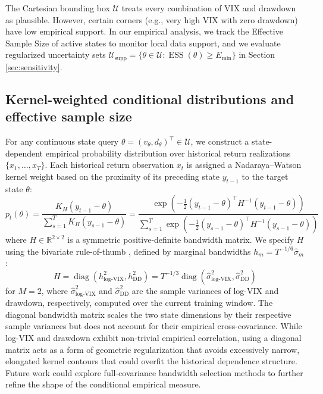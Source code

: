 \documentclass[smallextended]{svjour3}
\begin{document}
\begin{remark}
The Cartesian bounding box $\mathcal{U}$ treats every combination of VIX and drawdown as plausible. However, certain corners (e.g., very high VIX with zero drawdown) have low empirical support. In our empirical analysis, we track the Effective Sample Size of active states to monitor local data support, and we evaluate regularized uncertainty sets $\mathcal{U}_{\text{supp}} = \{\theta \in \mathcal{U} : \operatorname{ESS}(\theta) \ge E_{\min}\}$ in Section \ref{sec:sensitivity}.
\end{remark}






\subsection{Kernel-weighted conditional distributions and effective sample size}
For any continuous state query $\theta = (v_\theta, d_\theta)^\top \in \mathcal{U}$, we construct a state-dependent empirical probability distribution over historical return realizations $\{x_1, \dots, x_T\}$. Each historical return observation $x_t$ is assigned a Nadaraya--Watson kernel weight \cite{nadaraya1964estimating, watson1964smooth} based on the proximity of its preceding state $y_{t-1}$ to the target state $\theta$:
\begin{equation}
    p_t(\theta) = \frac{K_H(y_{t-1} - \theta)}{\sum_{s=1}^{T} K_H(y_{s-1} - \theta)} = \frac{\exp\left(-\frac{1}{2}(y_{t-1} - \theta)^\top H^{-1} (y_{t-1} - \theta)\right)}{\sum_{s=1}^T \exp\left(-\frac{1}{2}(y_{s-1} - \theta)^\top H^{-1} (y_{s-1} - \theta)\right)}
\end{equation}
where $H \in \mathbb{R}^{2 \times 2}$ is a symmetric positive-definite bandwidth matrix. We specify $H$ using the bivariate rule-of-thumb \cite{silverman1986density}, defined by marginal bandwidths $h_m = T^{-1/6}\hat\sigma_m$:
\begin{equation}
    H = \operatorname{diag}\left(h_{\text{log-VIX}}^2, h_{\text{DD}}^2\right) = T^{-1/3} \operatorname{diag}\left(\hat{\sigma}_{\text{log-VIX}}^2, \hat{\sigma}_{\text{DD}}^2\right)
\end{equation}
for $M = 2$, where $\hat{\sigma}^2_{\log\text{-VIX}}$ and $\hat{\sigma}^2_{\text{DD}}$ are the sample variances of log-VIX and drawdown, respectively, computed over the current training window. The diagonal bandwidth matrix scales the two state dimensions by their respective sample variances but does not account for their empirical cross-covariance. While log-VIX and drawdown exhibit non-trivial empirical correlation, using a diagonal matrix acts as a form of geometric regularization that avoids excessively narrow, elongated kernel contours that could overfit the historical dependence structure. Future work could explore full-covariance bandwidth selection methods to further refine the shape of the conditional empirical measure.
\end{document}
